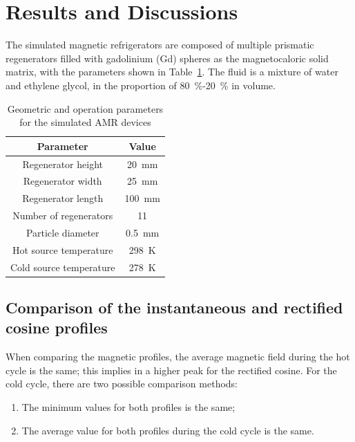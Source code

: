 \documentclass[draft]{svjour3}
\begin{document}
\section{Results and Discussions}
\label{sec:results-discussions}


The simulated magnetic refrigerators are composed of multiple prismatic regenerators filled with gadolinium (Gd) spheres as the magnetocaloric solid matrix, with the parameters shown in Table~\ref{tab:params}. The fluid is a mixture of water and ethylene glycol, in the proportion of \SI{80}{\percent}-\SI{20}{\percent} in volume.

\begin{table}[!ht]
  \centering
  \caption{Geometric and operation parameters for the simulated AMR devices}
  \begin{tabular}{c|c}
\hline
    \textbf{Parameter}&\textbf{Value}\\
\hline
Regenerator height & \SI{20}{\mm}\\
Regenerator width & \SI{25}{\mm}\\
Regenerator length & \SI{100}{\mm}\\
Number of regenerators & \num{11} \\
Particle diameter & \SI{0.5}{\mm}\\
Hot source temperature & \SI{298}{\kelvin}\\
Cold source temperature & \SI{278}{\kelvin}\\
\hline
  \end{tabular}
  \label{tab:params}
\end{table}

\subsection{Comparison of the instantaneous and rectified cosine profiles}
\label{sec:comp-inst-cosine}

When comparing the magnetic profiles, the average magnetic field during the hot cycle is the same; this implies in a higher peak for the rectified cosine. For the cold cycle, there are two possible comparison methods:

\begin{enumerate}
\item The minimum values for both profiles is the same;
\item The average value for both profiles during the cold cycle is the same.
\end{enumerate}
\end{document}
